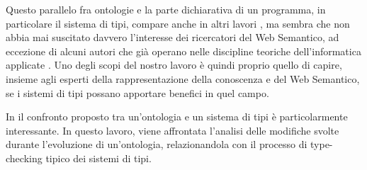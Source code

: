 Questo parallelo fra ontologie e la parte dichiarativa di un programma, in particolare il sistema di tipi, compare anche in altri lavori \cite{moten2015SWTypeSystem, despeyroux2008evolution}, ma sembra che non abbia mai suscitato davvero l'interesse dei ricercatori del Web Semantico, ad eccezione di alcuni autori che già operano nelle discipline teoriche dell'informatica applicate \cite{dapoigny2011typetheoryKR, leinbergerphdthesis, ciobanu2016typeFoundationforRDFS}. Uno degli scopi del nostro lavoro è quindi proprio quello di capire, insieme agli esperti della rappresentazione della conoscenza e del Web Semantico, se i sistemi di tipi possano apportare benefici in quel campo.

In \cite{despeyroux2008evolution} il confronto proposto tra un'ontologia e un sistema di tipi è particolarmente interessante. In questo lavoro, viene affrontata l'analisi delle modifiche svolte durante l'evoluzione di un'ontologia, relazionandola con il processo di type-checking tipico dei sistemi di tipi.

